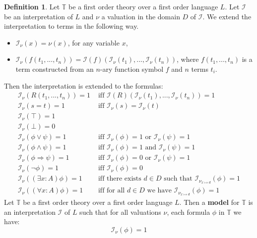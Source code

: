 \documentclass[12pt]{article}
\theoremstyle{plain}
\theoremstyle{definition}
\newtheorem{defn}[thm]{Definition} %
\newcommand{\bb}[1]{\mathbb{#1}}
\newcommand{\call}[1]{\mathcal{#1}}
\begin{document}
\begin{defn}\label{def:interpretation}
	Let $\bb{T}$ be a first order theory over a first order language $L$. Let $\call{I}$ be an interpretation of $L$ and $\nu$ a valuation in the domain $D$ of $\call{I}$. We extend the interpretation to terms in the following way.
	\begin{itemize}
		\item $\call{I}_{\nu}(x) = \nu(x)$, for any variable $x$,
		\item $\call{I}_{\nu}(f(t_1,...,t_n)) = \call{I}(f)(\call{I}_{\nu}(t_1),...,\call{I}_{\nu}(t_n))$, where $f(t_1,...,t_n)$ is a term constructed from an $n$-ary function symbol $f$ and $n$ terms $t_i$.
	\end{itemize}
	Then the interpretation is extended to the formulas:
	\begin{align}
		\call{I}_{\nu}(R(t_1,...,t_n)) = 1 &\text{ iff } \call{I}(R)(\call{I}_{\nu}(t_1),...,\call{I}_{\nu}(t_n)) = 1\\
		\call{I}_{\nu}(s = t) = 1 &\text{ iff }\call{I}_{\nu}(s) = \call{I}_{\nu}(t)\\
		\call{I}_{\nu}(\top) = 1&\\
		\call{I}_{\nu}(\bot) = 0&\\
		\call{I}_{\nu}(\phi \vee \psi) = 1&\text{ iff }\call{I}_{\nu}(\phi) = 1\text{ or }\call{I}_{\nu}(\psi) = 1\\
		\call{I}_{\nu}(\phi \wedge \psi) = 1&\text{ iff }\call{I}_{\nu}(\phi) = 1\text{ and }\call{I}_{\nu}(\psi) = 1\\
		\call{I}_{\nu}(\phi \Rightarrow \psi) = 1&\text{ iff }\call{I}_{\nu}(\phi) = 0\text{ or }\call{I}_{\nu}(\psi) = 1\\
		\call{I}_{\nu}(\neg \phi) = 1&\text{ iff }\call{I}_{\nu}(\phi) = 0\\
		\call{I}_{\nu}((\exists x:A)\phi) = 1&\text{ iff there exists }d \in D\text{ such that }\call{I}_{\nu_{x \mapsto d}}(\phi) = 1\\
		\call{I}_{\nu}((\forall x:A)\phi) = 1&\text{ iff for all }d \in D\text{ we have }\call{I}_{\nu_{x \mapsto d}}(\phi) = 1
	\end{align}
	Let $\bb{T}$ be a first order theory over a first order language $L$. Then a \textbf{model} for $\bb{T}$ is an interpretation $\call{I}$ of $L$ such that for all valuations $\nu$, each formula $\phi$ in $\bb{T}$ we have:
	\begin{equation}
		\call{I}_{\nu}(\phi) = 1
	\end{equation}
\end{defn}
\end{document}
